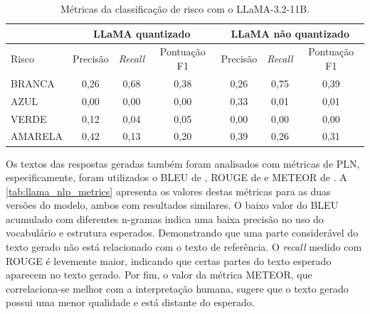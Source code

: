 \begin{table}[ht]
    \caption{\small Métricas da classificação de risco com o \ac{LLaMA}-3.2-11B.}
    \centering
    \begin{tabular}{l|c|c|c|c|c|c}
        \hline
                        & \multicolumn{3}{c|}{\ac{LLaMA} quantizado} & \multicolumn{3}{c}{\ac{LLaMA} não
        quantizado}
        \\ \hline
        Risco           & Precisão                                   & \textit{Recall}
                        & Pontuação F1                               & Precisão                          &
        \textit{Recall} & Pontuação F1
        \\ \hline
        BRANCA          & 0,26                                       & 0,68
                        & 0,38                                       & 0,26                              & 0,75
                        & 0,39
        \\
        AZUL            & 0,00                                       & 0,00
                        & 0,00                                       & 0,33                              & 0,01
                        & 0,01
        \\
        VERDE           & 0,12                                       & 0,04
                        & 0,05                                       & 0,00                              & 0,00
                        & 0,00
        \\
        AMARELA         & 0,42                                       & 0,13
                        & 0,20                                       & 0,39                              & 0,26
                        & 0,31
        \\ \hline
    \end{tabular}
    \label{tab:llama_risk_classification_report}
\end{table}

Os textos das respostas geradas também foram analisados com métricas de \ac{PLN}, especificamente, foram utilizados o
\ac{BLEU} de \textcite{papineni2002bleu}, \ac{ROUGE} de \textcite{lin2004rouge} e \ac{METEOR} de
\textcite{denkowski2014meteor}. A \autoref{tab:llama_nlp_metrics} apresenta os valores destas métricas para as
duas versões do modelo, ambos com resultados similares. O baixo valor do \ac{BLEU} acumulado com diferentes n-gramas
indica uma baixa precisão no uso do vocabulário e estrutura esperados. Demonstrando que uma parte considerável do texto
gerado não está relacionado com o texto de referência. O \textit{recall} medido com \ac{ROUGE} é levemente maior,
indicando que certas partes do texto esperado aparecem no texto gerado. Por fim, o valor da métrica \ac{METEOR}, que
correlaciona-se melhor com a interpretação humana, sugere que o texto gerado possui uma menor qualidade e está distante
do esperado.

